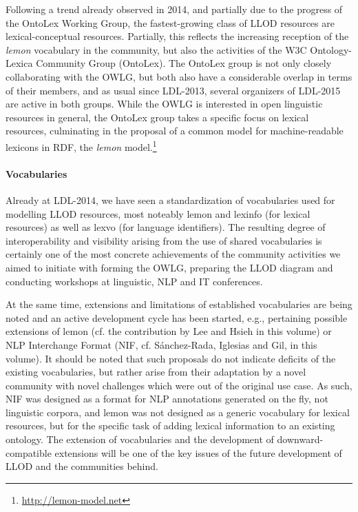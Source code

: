 Following a trend already observed in 2014, and partially due to the progress of the OntoLex Working Group, the fastest-growing class of LLOD resources are lexical-conceptual resources. 
Partially, this reflects the increasing reception of the \emph{lemon} vocabulary in the community, but also the activities of the W3C Ontology-Lexica Community Group (OntoLex). The OntoLex group is not only closely collaborating with the OWLG, but both also have a considerable overlap in terms of their members, and as usual since LDL-2013, several organizers of LDL-2015 are active in both groups.
While the OWLG is interested in open linguistic resources in general, the OntoLex group takes a specific focus on lexical resources, culminating in the proposal of a common model for machine-readable lexicons in RDF, the \emph{lemon} model.\footnote{
	\url{http://lemon-model.net}
}

\paragraph{Vocabularies}

Already at LDL-2014, we have seen a standardization of vocabularies used for modelling LLOD resources, most noteably lemon and lexinfo (for lexical resources) as well as lexvo (for language identifiers). The resulting degree of interoperability and visibility arising from the use of shared vocabularies is certainly one of the most concrete achievements of the community activities we aimed to initiate with forming the OWLG, preparing the LLOD diagram and conducting workshops at linguistic, NLP and IT conferences.

At the same time, extensions and limitations of established vocabularies are being noted and an active development cycle has been started, e.g., pertaining possible extensions of lemon (cf. the contribution by Lee and Hsieh in this volume) or NLP Interchange Format (NIF, cf. S\'{a}nchez-Rada, Iglesias and Gil, in this volume). 
It should be noted that such proposals do not indicate deficits of the existing vocabularies, but rather arise from their adaptation by a novel community with novel challenges which were out of the original use case. As such, NIF was designed as a format for NLP annotations generated on the fly, not linguistic corpora, and lemon was not designed as a generic vocabulary for lexical resources, but for the specific task of adding lexical information to an existing ontology. 
The extension of vocabularies and the development of downward-compatible extensions will be one of the key issues of the future development of LLOD and the communities behind.
 
